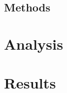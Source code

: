 \documentclass[12pt]{article}
\begin{document}
		\subsection{Methods}
		
	
	\section{Analysis}
	\section{Results}
	
\end{document}
